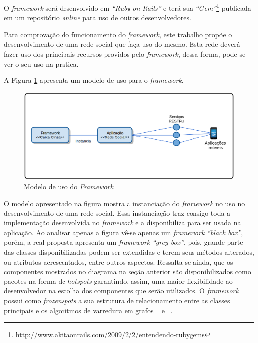 O \textit{framework} será desenvolvido em \textit{``Ruby on Rails''} e terá sua \textit{``Gem''}\footnote{\url{http://www.akitaonrails.com/2009/2/2/entendendo-rubygems}} publicada em um repositório \textit{online} para uso de outros desenvolvedores.

Para comprovação do funcionamento do \textit{framework}, este trabalho propõe o desenvolvimento de uma rede social que faça uso do mesmo. Esta rede deverá fazer uso dos principais recursos providos pelo \textit{framework}, dessa forma, pode-se ver o seu uso na prática.

A Figura \ref{uso_proposto} apresenta um modelo de uso para o \textit{framework}.

\begin{figure}[!h]
	\centering
	\includegraphics[scale=0.45]{figuras/capitulo5/uso_proposto.eps}
	\caption{Modelo de uso do \textit{Framework}}
	\label{uso_proposto}
\end{figure}

O modelo apresentado na figura mostra a instanciação do \textit{framework} no uso no desenvolvimento de uma rede social. Essa instanciação traz consigo toda a implementação desenvolvida no \textit{framework} e a disponibiliza para ser usada na aplicação. Ao analisar apenas a figura vê-se apenas um \textit{framework} \textit{``black box''}, porém, a real proposta apresenta um \textit{framework} \textit{``grey box''}, pois, grande parte das classes disponibilizadas podem ser extendidas e terem seus métodos alterados, ou atributos acrescentados, entre outros aspectos. Ressalta-se ainda, que os componentes mostrados no diagrama na seção anterior são disponibilizados como pacotes na forma de \textit{hotspots} \cite{Franca:2001} garantindo, assim, uma maior flexibilidade ao desenvolvedor na escolha dos componentes que serão utilizados. O \textit{framework} possui como \textit{frozenspots} \cite{Franca:2001} a sua estrutura de relacionamento entre as classes principais e os algoritmos de varredura em grafos ~ e ~.

